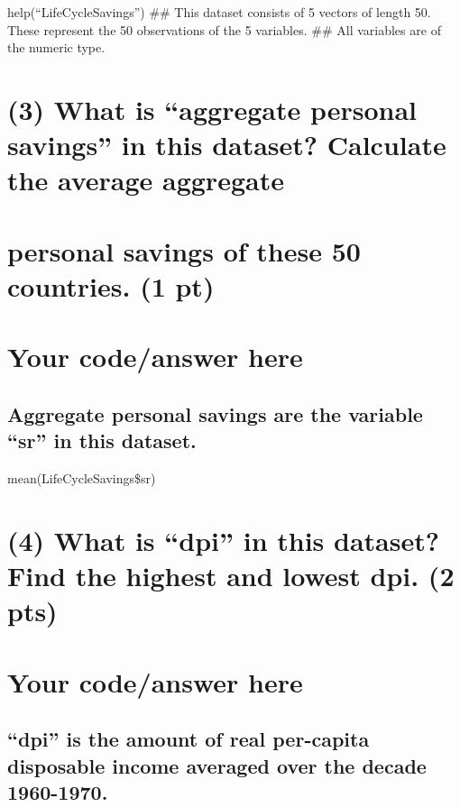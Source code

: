 \documentclass[]{article}
\begin{document}
help(``LifeCycleSavings'') \#\# This dataset consists of 5 vectors of
length 50. These represent the 50 observations of the 5 variables. \#\#
All variables are of the numeric type.

\section{\texorpdfstring{(3) What is ``aggregate personal savings'' in
this dataset? Calculate the average
aggregate}{(3) What is aggregate personal savings in this dataset? Calculate the average aggregate}}\label{what-is-aggregate-personal-savings-in-this-dataset-calculate-the-average-aggregate}

\section{personal savings of these 50 countries. (1
pt)}\label{personal-savings-of-these-50-countries.-1-pt}

\section{Your code/answer here}\label{your-codeanswer-here-2}

\subsection{\texorpdfstring{Aggregate personal savings are the variable
``sr'' in this
dataset.}{Aggregate personal savings are the variable sr in this dataset.}}\label{aggregate-personal-savings-are-the-variable-sr-in-this-dataset.}

mean(LifeCycleSavings\$sr)

\section{\texorpdfstring{(4) What is ``dpi'' in this dataset? Find the
highest and lowest dpi. (2
pts)}{(4) What is dpi in this dataset? Find the highest and lowest dpi. (2 pts)}}\label{what-is-dpi-in-this-dataset-find-the-highest-and-lowest-dpi.-2-pts}

\section{Your code/answer here}\label{your-codeanswer-here-3}

\subsection{\texorpdfstring{``dpi'' is the amount of real per-capita
disposable income averaged over the decade
1960-1970.}{dpi is the amount of real per-capita disposable income averaged over the decade 1960-1970.}}\label{dpi-is-the-amount-of-real-per-capita-disposable-income-averaged-over-the-decade-1960-1970.}
\end{document}
